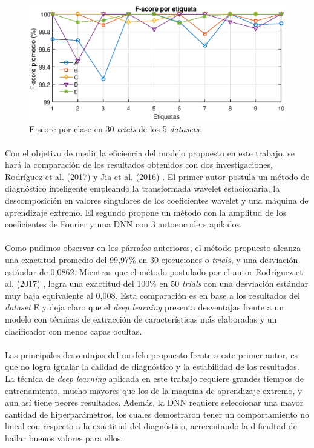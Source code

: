 \documentclass[12pt]{article}
\begin{document}
\begin{figure}[ht]
  \centering
    \includegraphics[scale=0.9]{./Fsc.eps}
  \caption{F-score por clase en 30 \textit{trials} de los 5 \textit{datasets}.}
  \label{fig:fsc}
\end{figure}

\paragraph{}
Con el objetivo de medir la eficiencia del modelo propuesto en este trabajo, se hará la comparación de los resultados obtenidos con dos investigaciones, Rodríguez et al. (2017) \cite{nibaldo} y Jia et al. (2016) \cite{jia} . El primer autor postula un método de diagnóstico inteligente empleando la transformada wavelet estacionaria, la descomposición en valores singulares de los coeficientes wavelet y una máquina de aprendizaje extremo. El segundo propone un método con la amplitud de los coeficientes de Fourier y una DNN con 3 autoencoders apilados.

\paragraph{}
Como pudimos observar en los párrafos anteriores, el método propuesto alcanza una exactitud promedio del 99,97\% en 30 ejecuciones o \textit{trials}, y una desviación estándar de 0,0862. Mientras que el método postulado por el autor Rodríguez et al. (2017) \cite{nibaldo}, logra una exactitud del 100\% en 50 \textit{trials} con una desviación estándar muy baja equivalente al 0,008. Esta comparación es en base a los resultados del \textit{dataset} E y deja claro que el \textit{deep learning} presenta desventajas frente a un modelo con técnicas de extracción de características más elaboradas y un clasificador con menos capas ocultas.

\paragraph{}
Las principales desventajas del modelo propuesto frente a este primer autor, es que no logra igualar la calidad de diagnóstico y la estabilidad de los resultados. La técnica de \textit{deep learning} aplicada en este trabajo requiere grandes tiempos de entrenamiento, mucho mayores que los de la maquina de aprendizaje extremo, y aun así tiene peores resultados. Además, la DNN requiere seleccionar una mayor cantidad de hiperparámetros, los cuales demostraron tener un comportamiento no lineal con respecto a la exactitud del diagnóstico, acrecentando la dificultad de hallar buenos valores para ellos.  
\end{document}
